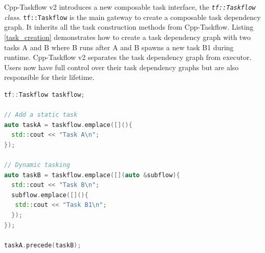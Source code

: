 \documentclass[conference]{IEEEtran}
\begin{document}
Cpp-Taskflow v2 introduces a new composable task interface, 
the \textit{\lstinline{tf::Taskflow} class}.
\lstinline{tf::Taskflow} is the main gateway to create a composable task dependency graph.
It inherits all the task construction methods from Cpp-Taskflow.
Listing \ref{task_creation} demonstrates how to create a task dependency graph with two tasks A and B 
where B runs after A and B spawns a new task B1 during runtime.
Cpp-Taskflow v2 separates the task dependency graph from executor.
Users now have full control over their task dependency graphs but are also responsible 
for their lifetime.

\begin{lstlisting}[language=C++,label=task_creation,caption={Create a task dependency graph of two dependent static tasks and one dynamic task.}]
tf::Taskflow taskflow;

// Add a static task 
auto taskA = taskflow.emplace([](){
  std::cout << "Task A\n";
});

// Dynamic tasking
auto taskB = taskflow.emplace([](auto &subflow){
  std::cout << "Task B\n";
  subflow.emplace([](){
   std::cout << "Task B1\n";   
  });
});

taskA.precede(taskB);
\end{lstlisting}
\end{document}
